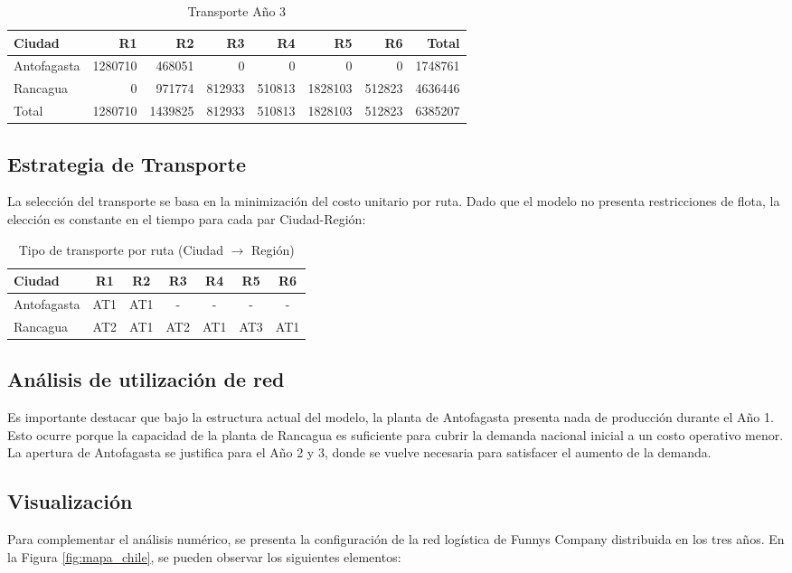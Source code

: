 \documentclass{article}
\begin{document}
\begin{table}[h!]
\centering
\begin{tabular}{lrrrrrrr}
\hline
Ciudad & R1 & R2 & R3 & R4 & R5 & R6 & Total \\
\hline
Antofagasta & 1280710 & 468051 & 0 & 0 & 0 & 0 & 1748761 \\
Rancagua & 0 & 971774 & 812933 & 510813 & 1828103 & 512823 & 4636446 \\
\hline
Total & 1280710 & 1439825 & 812933 & 510813 & 1828103 & 512823 & 6385207 \\
\hline
\end{tabular}
\caption{Transporte Año 3}
\end{table}

\subsection{Estrategia de Transporte}
La selección del transporte se basa en la minimización del costo unitario por ruta. Dado que el modelo no presenta restricciones de flota, la elección es constante en el tiempo para cada par Ciudad-Región:
\begin{table}[h!]
\centering
\begin{tabular}{lcccccc}
\hline
Ciudad & R1 & R2 & R3 & R4 & R5 & R6 \\
\hline
Antofagasta & AT1 & AT1 & - & - & - & - \\
Rancagua    & AT2 & AT1 & AT2 & AT1 & AT3 & AT1 \\
\hline
\end{tabular}
\caption{Tipo de transporte por ruta (Ciudad $\rightarrow$ Región)}
\end{table}

\subsection{Análisis de utilización de red}
Es importante destacar que bajo la estructura actual del modelo, la planta de Antofagasta presenta nada de producción durante el Año 1. Esto ocurre porque la capacidad de la planta de Rancagua es suficiente para cubrir la demanda nacional inicial a un costo operativo menor. La apertura de Antofagasta se justifica para el Año 2 y 3, donde se vuelve necesaria para satisfacer el aumento de la demanda.

\subsection{Visualización}
Para complementar el análisis numérico, se presenta la configuración de la red logística de Funnys Company distribuida en los tres años. En la Figura \ref{fig:mapa_chile}, se pueden observar los siguientes elementos:
\end{document}
